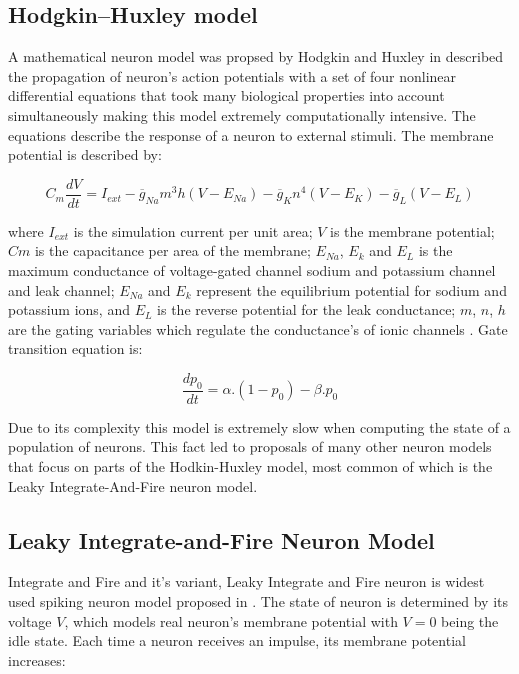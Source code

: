 \subsection{Hodgkin–Huxley model}

A mathematical neuron model was propsed by Hodgkin and Huxley in \cite{35} described the propagation of neuron’s action potentials with a set of four nonlinear differential equations that took many biological properties into account simultaneously making this model extremely computationally intensive. The equations describe the response of a neuron to external stimuli. The membrane potential is described by:

\begin{equation}\label{eq:hodg}
C_{m}\frac{dV}{dt}=I_{ext}-\overline{g}_{Na}m^{3}h(V-E_{Na})-\overline{g}_{K}n^{4}(V-E_{K})-\overline{g}_{L}(V-E_{L}) 
\end{equation}

where \(I_{ext}\) is the simulation current per unit area; \(V\) is the membrane potential; \(Cm\) is the capacitance per area of the membrane; \(E_{Na}\), \(E_{k}\) and \(E_{L}\) is the maximum conductance of voltage-gated channel sodium and potassium channel and leak channel; \(E_{Na}\) and \(E_{k}\) represent the equilibrium potential for sodium and potassium ions, and \(E_{L}\) is the reverse potential for the leak conductance; \(m\), \(n\), \(h\) are the gating variables which regulate the conductance's of ionic channels \cite{36}. Gate transition equation is:

\begin{equation}\label{eq:gateTransEq}
	\frac{dp_{0}}{dt}=\alpha.(1-p_{0})-\beta.p_{0} 
\end{equation}

Due to its complexity this model is extremely slow when computing the state of a population of neurons. This fact led to proposals of many other neuron models that focus on parts of the Hodkin-Huxley model, most common of which is the Leaky Integrate-And-Fire neuron model.

\subsection{Leaky Integrate-and-Fire Neuron Model}
Integrate and Fire and it’s variant, Leaky Integrate and Fire neuron is widest used spiking neuron model proposed in \cite{37}. The state of neuron is determined by its voltage \(V\), which models real neuron’s membrane potential with \(V=0\)  being the idle state. Each time a neuron receives an impulse, its membrane potential increases:

